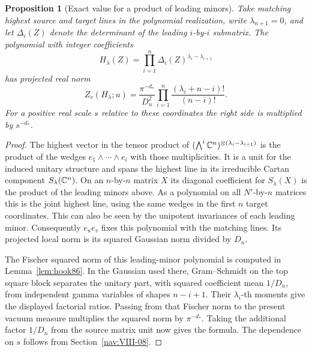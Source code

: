 \documentclass[a4paper,11pt]{article}
\newtheorem{proposition}{Proposition}[section]
\theoremstyle{definition}
\theoremstyle{remark}
\numberwithin{equation}{section}
\begin{document}
\begin{proposition}[Exact value for a product of leading minors]
\label{prop:minor181}
Take matching highest source and target lines in the
polynomial realization, write \(\lambda_{n+1}=0\), and let
\(\Delta_i(Z)\) denote the determinant of the leading
\(i\)-by-\(i\) submatrix. The polynomial with integer
coefficients
\[
       H_\lambda(Z)=\prod_{i=1}^n
                      \Delta_i(Z)^{\lambda_i-\lambda_{i+1}}
\]
has projected real norm
\begin{equation}
    Z_v(H_\lambda;u)
    =\frac{\pi^{-d_*}}{D_n^2}
       \prod_{i=1}^n\frac{(\lambda_i+n-i)!}{(n-i)!}.
                                                              \label{eq:minor181}
\end{equation}
For a positive real scale \(s\) relative to these coordinates
the right side is multiplied by \(s^{-d_*}\).
\end{proposition}
\begin{proof}
The highest vector in the tensor product of
\((\bigwedge^i\mathbb C^n)^{\otimes(\lambda_i-\lambda_{i+1})}\)
is the product of the wedges \(e_1\wedge\cdots\wedge e_i\)
with those multiplicities. It is a unit for the induced
unitary structure and spans the highest line in its irreducible
Cartan component \(S_\lambda(\mathbb C^n)\). On an \(n\)-by-\(n\)
matrix \(X\) its diagonal coefficient for \(S_\lambda(X)\)
is the product of the leading minors above. As a polynomial
on all \(N'\)-by-\(n\) matrices this is the joint highest
line, using the same wedges in the first \(n\) target
coordinates. This can also be seen by the unipotent
invariances of each leading minor. Consequently \(e_u e_v\)
fixes this polynomial with the matching lines. Its projected
local norm is its squared Gaussian norm divided by \(D_n\).

The Fischer squared norm of this leading-minor polynomial
is computed in Lemma~\ref{lem:hook86}. In the Gaussian used
there, Gram--Schmidt on the top square block separates the
unitary part, with squared coefficient mean \(1/D_n\),
from independent gamma variables of shapes \(n-i+1\).
Their \(\lambda_i\)-th moments give the displayed factorial
ratios. Passing from that Fischer norm to the present
vacuum measure multiplies the squared norm by \(\pi^{-d_*}\).
Taking the additional factor \(1/D_n\) from the source
matrix unit now gives the formula. The dependence on \(s\)
follows from Section~\ref{nav:VIII-08}.
\end{proof}
\end{document}
